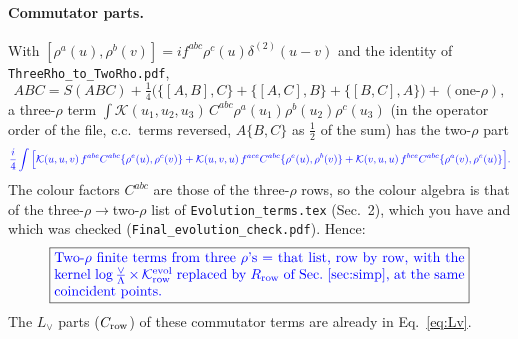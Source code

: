 \documentclass[10pt]{article}
\numberwithin{equation}{section}
\newcommand{\new}[1]{{\color{blue}#1}}
\newcommand{\Lv}{L_{\vee}}
\newcommand{\KK}{\mathcal K}
\begin{document}
\paragraph{Commutator parts.} With $[\rho^a(u),\rho^b(v)]=if^{abc}\rho^c(u)\delta^{(2)}(u-v)$ and the identity of \texttt{ThreeRho\_to\_TwoRho.pdf},
\begin{equation*}
ABC=S(ABC)+\tfrac14\big(\{[A,B],C\}+\{[A,C],B\}+\{[B,C],A\}\big)+(\text{one-}\rho),
\end{equation*}
a three-$\rho$ term $\int\KK(u_1,u_2,u_3)\,C^{abc}\rho^a(u_1)\rho^b(u_2)\rho^c(u_3)$ (in the operator order of the file, c.c.\ terms reversed, $A\{B,C\}$ as $\frac12$ of the sum) has the two-$\rho$ part
\begin{equation}
\new{\frac i4\int\Big[\KK(u,u,v)\,f^{abe}C^{abc}\{\rho^e(u),\rho^c(v)\}+\KK(u,v,u)\,f^{ace}C^{abc}\{\rho^e(u),\rho^b(v)\}+\KK(v,u,u)\,f^{bce}C^{abc}\{\rho^a(v),\rho^e(u)\}\Big].}
\label{eq:comm}
\end{equation}
The colour factors $C^{abc}$ are those of the three-$\rho$ rows, so the colour algebra is that of the three-$\rho\to$two-$\rho$ list of \texttt{Evolution\_terms.tex} (Sec.~2), which you have and which was checked (\texttt{Final\_evolution\_check.pdf}). Hence:
\begin{equation*}
\boxed{\parbox{0.85\textwidth}{\new{Two-$\rho$ finite terms from three $\rho$'s = that list, row by row, with the kernel $\log\frac{\vee}{\Lambda}\times\KK^{\rm evol}_{\rm row}$ replaced by $R_{\rm row}$ of Sec.~\ref{sec:simp}, at the same coincident points.}}}
\end{equation*}
The $\Lv$ parts ($C_{\rm row}$) of these commutator terms are already in Eq.~\eqref{eq:Lv}.

\end{document}
